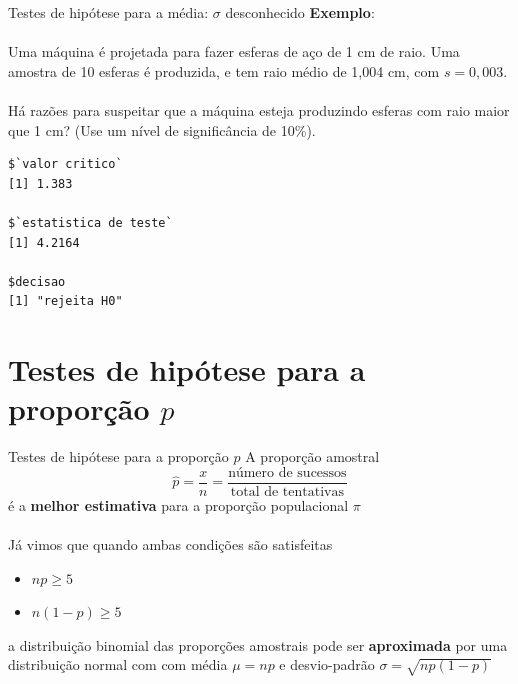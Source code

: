 \documentclass[10pt]{beamer}\usepackage[]{graphicx}\usepackage[]{color}
\makeatletter
\newenvironment{kframe}{%
 \def\at@end@of@kframe{}%
 \ifinner\ifhmode%
  \def\at@end@of@kframe{\end{minipage}}%
  \begin{minipage}{\columnwidth}%
 \fi\fi%
 \def\FrameCommand##1{\hskip\@totalleftmargin \hskip-\fboxsep
 \colorbox{shadecolor}{##1}\hskip-\fboxsep
     \hskip-\linewidth \hskip-\@totalleftmargin \hskip\columnwidth}%
 \MakeFramed {\advance\hsize-\width
   \@totalleftmargin\z@ \linewidth\hsize
   \@setminipage}}%
 {\par\unskip\endMakeFramed%
 \at@end@of@kframe}
\newenvironment{knitrout}{}{} %
\theoremstyle{definition}
\makeatother
\begin{document}
\begin{frame}[fragile]{Testes de hipótese para a média: $\sigma$ desconhecido}
  \textbf{Exemplo}: \\~\\
  Uma máquina é projetada para fazer esferas de aço de 1 cm de raio. Uma
  amostra de 10 esferas é produzida, e tem raio médio de 1,004
  cm, com $s = 0,003$. \\~\\
  Há razões para suspeitar que a máquina esteja produzindo esferas com
  raio maior que 1 cm? (Use um nível de significância de 10\%).
  \pause
\begin{knitrout}\footnotesize
{}\color{fgcolor}\begin{kframe}
\begin{verbatim}
$`valor critico`
[1] 1.383

$`estatistica de teste`
[1] 4.2164

$decisao
[1] "rejeita H0"
\end{verbatim}
\end{kframe}
\end{knitrout}
\end{frame}

\section{Testes de hipótese para a proporção $p$}

\begin{frame}{Testes de hipótese para a proporção $p$}
  A proporção amostral
  \begin{equation*}
    \hat{p} = \frac{x}{n} = \frac{\text{número de sucessos}}{\text{total de
        tentativas}}
  \end{equation*}
  é a \textbf{melhor estimativa} para a proporção populacional $\pi$
  \\~\\
  Já vimos que quando ambas condições são satisfeitas
  \begin{itemize}
  \item $np \geq 5$
  \item $n(1-p) \geq 5$
  \end{itemize}
  a distribuição binomial das proporções amostrais pode ser
  \textbf{aproximada} por uma distribuição normal com com média $\mu =
  np$ e desvio-padrão $\sigma = \sqrt{np(1-p)}$
\end{frame}
\end{document}
